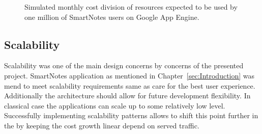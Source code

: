 \begin{figure}[ht]
  \begin{center}
  \end{center}
  \caption{Simulated monthly cost division of resources expected to be used by one million of SmartNotes users on Google App Engine.}
  \label{fig:gae_cost}
\end{figure}

\subsection{Scalability}
Scalability was one of the main design concerns by concerns of the presented project. SmartNotes application as mentioned in Chapter~\ref{sec:Introduction} was mend to meet scalability requirements same as care for the best user experience. Additionally the architecture should allow for future development flexibility. In classical case the applications can scale up to some relatively low level. Successfully implementing scalability patterns allows to shift this point further in the by keeping the cost growth linear depend on served traffic.  

